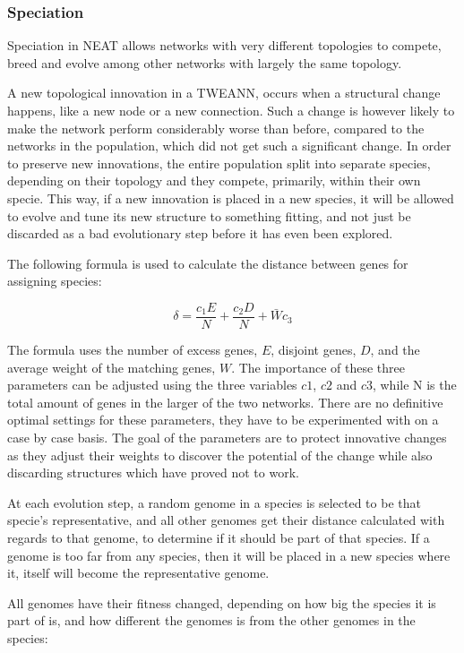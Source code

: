 \subsubsection{Speciation}
Speciation in NEAT allows networks with very different topologies to compete, breed and evolve among other networks with largely the same topology.

A new topological innovation in a TWEANN, occurs when a structural change happens, like a new node or a new connection. Such a change is however likely to make the network perform considerably worse than before, compared to the networks in the population, which did not get such a significant change. In order to preserve new innovations, the entire population split into separate species, depending on their topology and they compete, primarily, within their own specie. This way, if a new innovation is placed in a new species, it will be allowed to evolve and tune its new structure to something fitting, and not just be discarded as a bad evolutionary step before it has even been explored.

The following formula is used to calculate the distance between genes for assigning species: 

$$\delta = \frac{c_1E}{N} + \frac{c_2D}{N} + \bar W c_3$$

The formula uses the number of excess genes, $E$, disjoint genes, $D$, and the average weight of the matching genes, $W$. The importance of these three parameters can be adjusted using the three variables $c1$, $c2$ and $c3$, while N is the total amount of genes in the larger of the two networks. There are no definitive optimal settings for these parameters, they have to be experimented with on a case by case basis. The goal of the parameters are to protect innovative changes as they adjust their weights to discover the potential of the change while also discarding structures which have proved not to work. 

At each evolution step, a random genome in a species is selected to be that specie's representative, and all other genomes get their distance calculated with regards to that genome, to determine if it should be part of that species. If a genome is too far from any species, then it will be placed in a new species where it, itself will become the representative genome.

All genomes have their fitness changed, depending on how big the species it is part of is, and how different the genomes is from the other genomes in the species:

